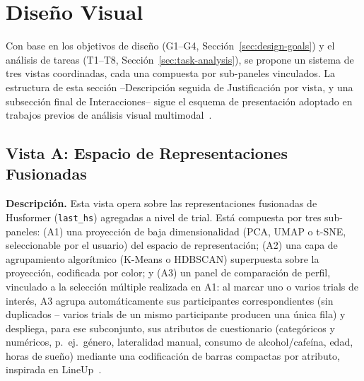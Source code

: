 \section{Diseño Visual}
\label{sec:visualdesign}

Con base en los objetivos de diseño (G1--G4, Sección~\ref{sec:design-goals}) y el análisis de tareas (T1--T8, Sección~\ref{sec:task-analysis}), se propone un sistema de tres vistas coordinadas, cada una compuesta por sub-paneles vinculados. La estructura de esta sección --Descripción seguida de Justificación por vista, y una subsección final de Interacciones-- sigue el esquema de presentación adoptado en trabajos previos de análisis visual multimodal~\cite{Emoco2019}.

\subsection{Vista A: Espacio de Representaciones Fusionadas}
\label{sec:vista_a}

\textbf{Descripción.} Esta vista opera sobre las representaciones fusionadas de Husformer (\texttt{last\_hs}) agregadas a nivel de trial. Está compuesta por tres sub-paneles: (A1) una proyección de baja dimensionalidad (PCA, UMAP o t-SNE, seleccionable por el usuario) del espacio de representación; (A2) una capa de agrupamiento algorítmico (K-Means o HDBSCAN) superpuesta sobre la proyección, codificada por color; y (A3) un panel de comparación de perfil, vinculado a la selección múltiple
realizada en A1: al marcar uno o varios trials de interés, A3 agrupa
automáticamente sus participantes correspondientes (sin duplicados -- varios
trials de un mismo participante producen una única fila) y despliega, para
ese subconjunto, sus atributos de cuestionario (categóricos y numéricos,
p.\ ej.\ género, lateralidad manual, consumo de alcohol/cafeína, edad, horas
de sueño) mediante una codificación de barras compactas por atributo,
inspirada en LineUp~\cite{gratzl2013lineup}.

